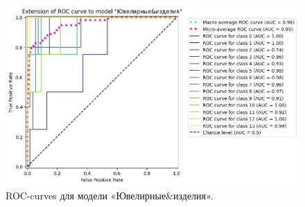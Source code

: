 \documentclass[a4paper,12pt]{extarticle}
\begin{document}
\begin{figure}[hbtp]
	\centering
	\includegraphics[scale=0.7]{roc_curves/roccurve_Ювелирные&изделия.png}
	\caption{ROC-curves для модели «Ювелирные\&изделия».}
	\label{fig:roccurve_Ювелирные&изделия}
\end{figure}
\end{document}
